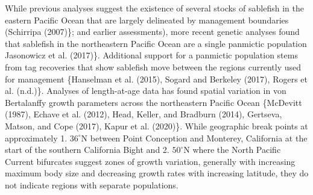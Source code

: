\documentclass[11pt,
  english,
  a4paper,
]{article}
\begin{document}
While previous analyses suggest the existence of several stocks of sablefish in the eastern Pacific Ocean that are largely delineated by management boundaries ({Schirripa (2007)\leavevmode\tagmcend\tagstructend}\}; and earlier assessments), more recent genetic analyses found that sablefish in the northeastern Pacific Ocean are a single panmictic population {Jasonowicz et al. (2017)\leavevmode\tagmcend\tagstructend}\}. Additional support for a panmictic population stems from tag recoveries that show sablefish move between the regions currently used for management \{{Hanselman et al. (2015)\leavevmode\tagmcend\tagstructend}, {Sogard and Berkeley (2017)\leavevmode\tagmcend\tagstructend}, {Rogers et al. (n.d.)\leavevmode\tagmcend\tagstructend}\}. Analyses of length-at-age data has found spatial variation in von Bertalanffy growth parameters across the northeastern Pacific Ocean \{{McDevitt (1987)\leavevmode\tagmcend\tagstructend}, {Echave et al. (2012)\leavevmode\tagmcend\tagstructend}, {Head, Keller, and Bradburn (2014)\leavevmode\tagmcend\tagstructend}, {Gertseva, Matson, and Cope (2017)\leavevmode\tagmcend\tagstructend}, {Kapur et al. (2020)\leavevmode\tagmcend\tagstructend}\}. While geographic break points at approximately 1. {\(36^{\circ}\)\leavevmode\tagmcend\tagstructend}N between Point Conception and Monterey, California at the start of the southern California Bight and 2. {\(50^{\circ}\)\leavevmode\tagmcend\tagstructend}N where the North Pacific Current bifurcates suggest zones of growth variation, generally with increasing maximum body size and decreasing growth rates with increasing latitude, they do not indicate regions with separate populations.

\leavevmode\tagmcend\tagstructend\par

\end{document}
